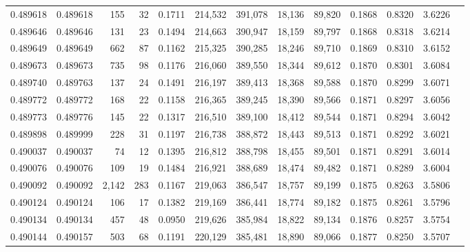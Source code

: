 \begin{tabular}{rrrrrrrrrrrrr}
0.489618 & 0.489618 &   155 &    32 &                                     0.1711 & 214,532 & 391,078 &  18,136 &  89,820 & 0.1868 & 0.8320 & 3.6226 \\
0.489646 & 0.489646 &   131 &    23 &                                     0.1494 & 214,663 & 390,947 &  18,159 &  89,797 & 0.1868 & 0.8318 & 3.6214 \\
0.489649 & 0.489649 &   662 &    87 &                                     0.1162 & 215,325 & 390,285 &  18,246 &  89,710 & 0.1869 & 0.8310 & 3.6152 \\
0.489673 & 0.489673 &   735 &    98 &                                     0.1176 & 216,060 & 389,550 &  18,344 &  89,612 & 0.1870 & 0.8301 & 3.6084 \\
0.489740 & 0.489763 &   137 &    24 &                                     0.1491 & 216,197 & 389,413 &  18,368 &  89,588 & 0.1870 & 0.8299 & 3.6071 \\
0.489772 & 0.489772 &   168 &    22 &                                     0.1158 & 216,365 & 389,245 &  18,390 &  89,566 & 0.1871 & 0.8297 & 3.6056 \\
0.489773 & 0.489776 &   145 &    22 &                                     0.1317 & 216,510 & 389,100 &  18,412 &  89,544 & 0.1871 & 0.8294 & 3.6042 \\
0.489898 & 0.489999 &   228 &    31 &                                     0.1197 & 216,738 & 388,872 &  18,443 &  89,513 & 0.1871 & 0.8292 & 3.6021 \\
0.490037 & 0.490037 &    74 &    12 &                                     0.1395 & 216,812 & 388,798 &  18,455 &  89,501 & 0.1871 & 0.8291 & 3.6014 \\
0.490076 & 0.490076 &   109 &    19 &                                     0.1484 & 216,921 & 388,689 &  18,474 &  89,482 & 0.1871 & 0.8289 & 3.6004 \\
0.490092 & 0.490092 & 2,142 &   283 &                                     0.1167 & 219,063 & 386,547 &  18,757 &  89,199 & 0.1875 & 0.8263 & 3.5806 \\
0.490124 & 0.490124 &   106 &    17 &                                     0.1382 & 219,169 & 386,441 &  18,774 &  89,182 & 0.1875 & 0.8261 & 3.5796 \\
0.490134 & 0.490134 &   457 &    48 &                                     0.0950 & 219,626 & 385,984 &  18,822 &  89,134 & 0.1876 & 0.8257 & 3.5754 \\
0.490144 & 0.490157 &   503 &    68 &                                     0.1191 & 220,129 & 385,481 &  18,890 &  89,066 & 0.1877 & 0.8250 & 3.5707 \\

\end{tabular}
